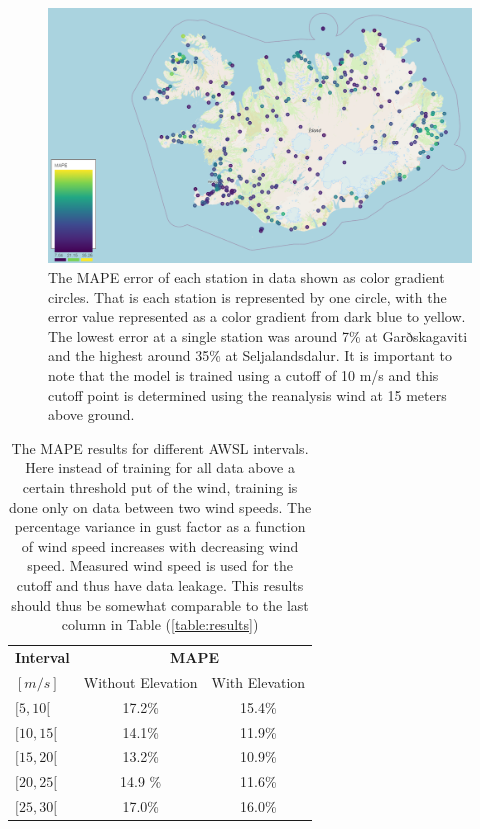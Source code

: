 \begin{figure}[h]
    \centering
    \includegraphics[scale = 0.5]{Figures/errorMap.png}
    \caption[MAPE error distribution of stations shown on a map of Iceland.]{The MAPE error of each station in data shown as color gradient circles. That is each station is represented by one circle, with the error value represented as a color gradient from dark blue to yellow. The lowest error at a single station was around 7\% at Garðskagaviti and the highest around 35\% at Seljalandsdalur. It is important to note that the model is trained using a cutoff of 10 m/s and this cutoff point is determined using the reanalysis wind at 15 meters above ground.}
    \label{fig:errorMap}
\end{figure}

\begin{table}[h]
    \caption[Model result looking at closed wind speed intervals]{The MAPE results for different AWSL intervals. Here instead of training for all data above a certain threshold put of the wind, training is done only on data between two wind speeds. The percentage variance in gust factor as a function of wind speed increases with decreasing wind speed. Measured wind speed is used for the cutoff and thus have data leakage. This results should thus be somewhat comparable to the last column in Table (\ref{table:results})}
    \label{table:closed_intervals}
    \centering
    \begin{tabular}{l | cc}
        \textbf{Interval} &  \multicolumn{2}{c}{\textbf{MAPE}}\\
        $[m/s]$ & Without Elevation & With Elevation\\\hline
        $[5, 10[$ & 17.2\% & 15.4\%\\ %
        $[10, 15[$ & 14.1\% & 11.9\%\\ %
        $[15, 20[$ & 13.2\% & 10.9\%\\ %
        $[20, 25[$ & 14.9 \% & 11.6\%\\ %
        $[25, 30[$ & 17.0\% & 16.0\%\\ %
    \end{tabular}
\end{table}

